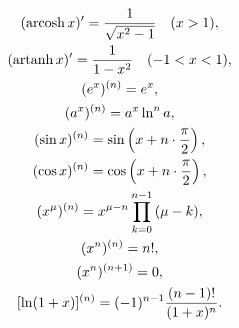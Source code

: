 \begin{gather*}
(\operatorname{arcosh} x)' = \frac{1}{\sqrt{x^2 - 1}} \quad (x > 1), \\
(\operatorname{artanh} x)' = \frac{1}{1 - x^2} \quad (-1 < x < 1), \\
(e^x)^{(n)} = e^x, \\
(a^x)^{(n)} = a^x \ln^n a, \\
(\sin x)^{(n)} = \sin \left( x + n \cdot \frac{\pi}{2} \right), \\
(\cos x)^{(n)} = \cos \left( x + n \cdot \frac{\pi}{2} \right), \\
(x^\mu)^{(n)} = x^{\mu-n}\prod_{k=0}^{n-1} {(\mu - k)}, \\
(x^n)^{(n)} = n!, \\
(x^n)^{(n+1)} = 0, \\
[\ln(1+x)]^{(n)} = (-1)^{n-1} \frac{(n-1)!}{(1+x)^n}.
\end{gather*}
